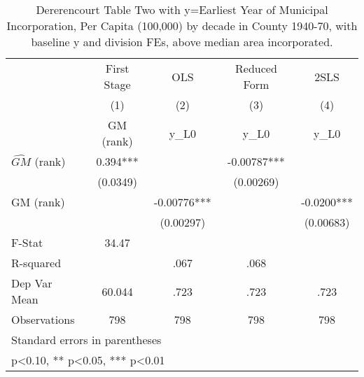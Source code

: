 \begin{table}[htbp]\centering
\def\sym#1{\ifmmode^{#1}\else\(^{#1}\)\fi}
\caption{Dererencourt Table Two with y=Earliest Year of Municipal Incorporation, Per Capita (100,000) by decade in County 1940-70, with baseline y and division FEs, above median area incorporated.}
\begin{tabular}{l*{4}{c}}
\toprule
                    & First Stage   &         OLS   &Reduced Form   &        2SLS   \\
                    &\multicolumn{1}{c}{(1)}&\multicolumn{1}{c}{(2)}&\multicolumn{1}{c}{(3)}&\multicolumn{1}{c}{(4)}\\
                    &\multicolumn{1}{c}{GM  (rank)}&\multicolumn{1}{c}{y\_L0}&\multicolumn{1}{c}{y\_L0}&\multicolumn{1}{c}{y\_L0}\\
\midrule
$\hat{GM}$ (rank)   &       0.394***&               &    -0.00787***&               \\
                    &    (0.0349)   &               &   (0.00269)   &               \\
\addlinespace
GM  (rank)          &               &    -0.00776***&               &     -0.0200***\\
                    &               &   (0.00297)   &               &   (0.00683)   \\
\midrule
F-Stat              &       34.47   &               &               &               \\
R-squared           &               &        .067   &        .068   &               \\
Dep Var Mean        &      60.044   &        .723   &        .723   &        .723   \\
Observations        &         798   &         798   &         798   &         798   \\
\bottomrule
\multicolumn{5}{l}{\footnotesize Standard errors in parentheses}\\
\multicolumn{5}{l}{\footnotesize * p<0.10, ** p<0.05, *** p<0.01}\\
\end{tabular}
\end{table}
